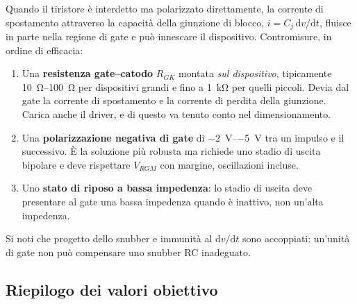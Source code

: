 \documentclass[11pt,a4paper]{article}
\begin{document}
Quando il tiristore è interdetto ma polarizzato direttamente, la corrente di
spostamento attraverso la capacità della giunzione di blocco,
$i = C_j\,\mathrm{d}v/\mathrm{d}t$, fluisce in parte nella regione di gate e può
innescare il dispositivo. Contromisure, in ordine di efficacia:

\begin{enumerate}
  \item Una \textbf{resistenza gate--catodo} $R_{GK}$ montata \emph{sul
        dispositivo}, tipicamente \SIrange{10}{100}{\ohm} per dispositivi grandi e
        fino a \SI{1}{\kilo\ohm} per quelli piccoli. Devia dal gate la corrente di
        spostamento e la corrente di perdita della giunzione. Carica anche il
        driver, e di questo va tenuto conto nel dimensionamento.
  \item Una \textbf{polarizzazione negativa di gate} di \SIrange{-2}{-5}{\volt} tra
        un impulso e il successivo. È la soluzione più robusta ma richiede uno
        stadio di uscita bipolare e deve rispettare $V_{RGM}$ con margine,
        oscillazioni incluse.
  \item Uno \textbf{stato di riposo a bassa impedenza}: lo stadio di uscita deve
        presentare al gate una bassa impedenza quando è inattivo, non un'alta
        impedenza.
\end{enumerate}

Si noti che progetto dello snubber e immunità al $\mathrm{d}v/\mathrm{d}t$ sono
accoppiati: un'unità di gate non può compensare uno snubber RC inadeguato.

\subsection{Riepilogo dei valori obiettivo}
\end{document}
